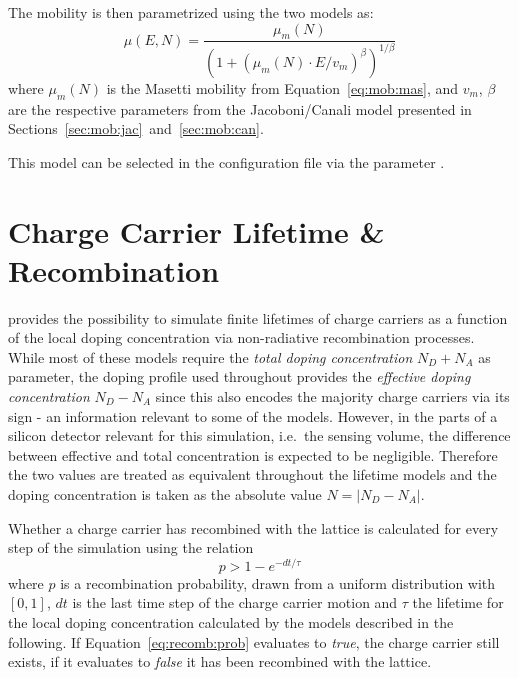 The mobility is then parametrized using the two models as:
\begin{equation}
    \label{eq:mob:mascan}
    \mu (E, N) = \frac{\mu_{m}(N)}{\left(1 + \left(\mu_{m}(N) \cdot E / v_{m} \right)^{\beta} \right)^{1 / \beta}}
\end{equation}
where $\mu_{m}(N)$ is the Masetti mobility from Equation~\eqref{eq:mob:mas}, and $v_{m}$, $\beta$ are the respective parameters from the Jacoboni/Canali model presented in Sections~\ref{sec:mob:jac}~and~\ref{sec:mob:can}.

This model can be selected in the configuration file via the parameter .


\section{Charge Carrier Lifetime \& Recombination}
\label{sec:recombination}

\apsq provides the possibility to simulate finite lifetimes of charge carriers as a function of the local doping concentration via non-radiative recombination processes.
While most of these models require the \emph{total doping concentration} $N_D + N_A$ as parameter, the doping profile used throughout \apsq provides the \emph{effective doping concentration} $N_D - N_A$ since this also encodes the majority charge carriers via its sign - an information relevant to some of the models.
However, in the parts of a silicon detector relevant for this simulation, i.e.\ the sensing volume, the difference between effective and total concentration is expected to be negligible.
Therefore the two values are treated as equivalent throughout the lifetime models and the doping concentration is taken as the absolute value $N = \left|N_D - N_A\right|$.

Whether a charge carrier has recombined with the lattice is calculated for every step of the simulation using the relation
\begin{equation}
    \label{eq:recomb:prob}
    p > 1 - e^{- dt / \tau}
\end{equation}
where $p$ is a recombination probability, drawn from a uniform distribution with $[0, 1]$, $dt$ is the last time step of the charge carrier motion and $\tau$ the lifetime for the local doping concentration calculated by the models described in the following.
If Equation~\eqref{eq:recomb:prob} evaluates to \emph{true}, the charge carrier still exists, if it evaluates to \emph{false} it has been recombined with the lattice.

